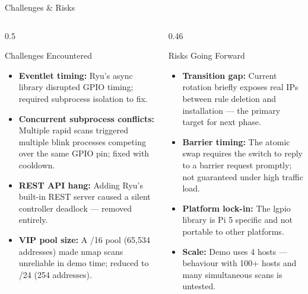 \documentclass[aspectratio=169,10pt]{beamer}
\begin{document}
\begin{frame}{Challenges \& Risks}
  \begin{columns}[T]
    \begin{column}{0.5\textwidth}
      \begin{block}{Challenges Encountered}
        \begin{itemize}\small\setlength\itemsep{5pt}
          \item \textbf{Eventlet timing:} Ryu's async library disrupted GPIO timing; required subprocess isolation to fix.
          \item \textbf{Concurrent subprocess conflicts:} Multiple rapid scans triggered multiple blink processes competing over the same GPIO pin; fixed with cooldown.
          \item \textbf{REST API hang:} Adding Ryu's built-in REST server caused a silent controller deadlock --- removed entirely.
          \item \textbf{VIP pool size:} A /16 pool (65,534 addresses) made nmap scans unreliable in demo time; reduced to /24 (254 addresses).
        \end{itemize}
      \end{block}
    \end{column}
    \begin{column}{0.46\textwidth}
      \begin{alertblock}{Risks Going Forward}
        \begin{itemize}\small\setlength\itemsep{5pt}
          \item \textbf{Transition gap:} Current rotation briefly exposes real IPs between rule deletion and installation --- the primary target for next phase.
          \item \textbf{Barrier timing:} The atomic swap requires the switch to reply to a barrier request promptly; not guaranteed under high traffic load.
          \item \textbf{Platform lock-in:} The lgpio library is Pi 5 specific and not portable to other platforms.
          \item \textbf{Scale:} Demo uses 4 hosts --- behaviour with 100+ hosts and many simultaneous scans is untested.
        \end{itemize}
      \end{alertblock}
    \end{column}
  \end{columns}
\end{frame}
\end{document}
